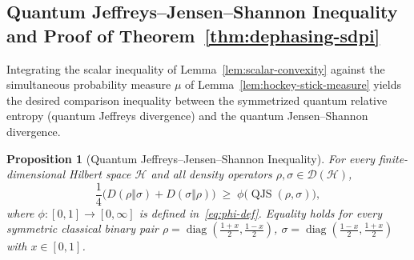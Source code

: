 \documentclass[10pt,a4paper]{article}
\numberwithin{equation}{section}
\theoremstyle{plain}
\newtheorem{proposition}[theorem]{Proposition}
\theoremstyle{definition}
\theoremstyle{remark}
\DeclareMathOperator{\diag}{diag}
\DeclareMathOperator{\QJS}{QJS}
\newcommand{\cH}{\mathcal{H}}
\newcommand{\cD}{\mathcal{D}}
\begin{document}
\subsection{Quantum Jeffreys--Jensen--Shannon Inequality and Proof of Theorem~\ref{thm:dephasing-sdpi}}

Integrating the scalar inequality of Lemma~\ref{lem:scalar-convexity} against the simultaneous probability measure $\mu$ of Lemma~\ref{lem:hockey-stick-measure} yields the desired comparison inequality between the symmetrized quantum relative entropy (quantum Jeffreys divergence) and the quantum Jensen--Shannon divergence.

\begin{proposition}[Quantum Jeffreys--Jensen--Shannon Inequality]\label{prop:qjjs}
For every finite-dimensional Hilbert space $\cH$ and all density operators $\rho, \sigma \in \cD(\cH)$,
\begin{equation}\label{eq:qjjs}
\frac{1}{4}\bigl(D(\rho \Vert \sigma) + D(\sigma \Vert \rho)\bigr) \;\ge\; \phi\bigl(\QJS(\rho, \sigma)\bigr),
\end{equation}
where $\phi : [0,1] \to [0,\infty]$ is defined in~\eqref{eq:phi-def}. Equality holds for every symmetric classical binary pair $\rho = \diag(\frac{1+x}{2}, \frac{1-x}{2})$, $\sigma = \diag(\frac{1-x}{2}, \frac{1+x}{2})$ with $x \in [0,1]$.
\end{proposition}
\end{document}
